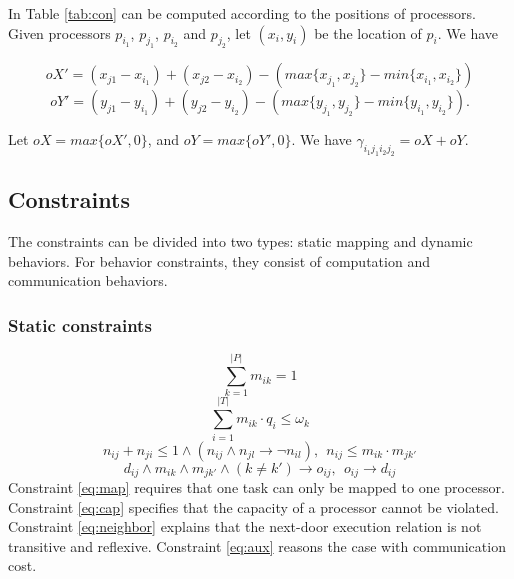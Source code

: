 In Table \ref{tab:con} can be computed according to the positions of processors. Given processors $p_{i_1}$, $p_{j_1}$, $p_{i_2}$ and $p_{j_2}$, let $(x_i,y_i)$ be the location of $p_i$. We have 
\begin{small}
 $$oX'=(x_{j1}-x_{i_1})+(x_{j2}-x_{i_2})-(max\{x_{j_1},x_{j_2}\}-min\{x_{i_1},x_{i_2}\})$$
 $$oY'=(y_{j1}-y_{i_1})+(y_{j2}-y_{i_2})-(max\{y_{j_1},y_{j_2}\}-min\{y_{i_1},y_{i_2}\}).$$
\end{small}
Let $oX=max\{oX',0\}$, and $oY=max\{oY',0\}$. We have $\gamma_{{i_1}{j_1}{i_2}{j_2}}=oX+oY$.  

\subsection{Constraints}
The constraints can be divided into two types: static mapping and dynamic behaviors. For behavior constraints, they consist of computation and communication behaviors. 

\subsubsection{Static constraints}
\begin{equation}\label{eq:map}
\sum^{|P|}_{k=1} m_{ik} =1
\end{equation}
\begin{equation}\label{eq:cap}
\sum^{|T|}_{i=1} m_{ik} \cdot q_i \leq \omega_k
\end{equation}
\begin{equation}\label{eq:neighbor}
n_{ij} + n_{ji} \leq 1 \wedge (n_{ij}\wedge n_{jl} \rightarrow \neg n_{il}), ~~n_{ij}\leq m_{ik}\cdot m_{jk'}
\end{equation}
\begin{equation}\label{eq:aux}
d_{ij}\wedge m_{ik}\wedge m_{jk'}\wedge (k\neq k') \rightarrow o_{ij}, ~~o_{ij}\rightarrow d_{ij}
\end{equation}
Constraint \ref{eq:map} requires that one task can only be mapped to one processor.
Constraint \ref{eq:cap} specifies that the capacity of a processor cannot be violated.
Constraint \ref{eq:neighbor} explains that the next-door execution relation is not transitive and reflexive.
Constraint \ref{eq:aux} reasons the case with communication cost.

